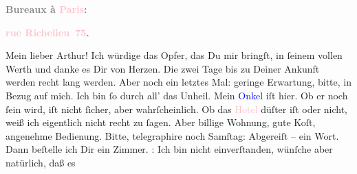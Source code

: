            \pstart
           \begin{otherlanguage}{french}\textcolor{gray}{\textbf{\textbf{Bureaux à \textcolor{pink}{Paris}{}\ledrightnote{\textcolor{pink}{Paris}}:}}}\end{otherlanguage}\pend
           \pstart
           \begin{otherlanguage}{french}\textcolor{gray}{\textbf{\textbf{\textcolor{pink}{rue Richelieu 75}{}\ledrightnote{\textcolor{pink}{rue Richelieu}}.}}}\end{otherlanguage}\pend
           \pstart\center{}Mein lieber Arthur!\pend\pstart
           Ich würdige das Opfer, das Du mir bringſt, in ſeinem vollen Werth und danke es Dir
               von Herzen. Die zwei Tage bis zu Deiner Ankunft werden recht lang werden. Aber noch
               ein letztes Mal: geringe Erwartung, bitte, in Bezug auf mich. Ich bin ſo \label{K_L02716-1v}\label{K_L02716-1h} durch all’
               das Unheil.\pend
           \pstart
           Mein \textcolor{blue}{Onkel}{} iſt hier. Ob er
               noch \label{K_L02716-2v}\label{K_L02716-2h} ſein wird, iſt nicht ſicher,
               aber wahrſcheinlich. Ob das {\pb}\textcolor{pink}{Hotel}{} düſter iſt oder nicht,
               weiß ich eigentlich nicht recht zu ſagen. Aber billige Wohnung, gute Koſt, angenehme
               Bedienung. Bitte, telegraphire noch Samſtag: Abgereiſt
                  – ein Wort. Dann beſtelle ich Dir ein Zimmer.\pend
           \pstart
           \label{K_L02716-3v}\label{K_L02716-3h}: Ich bin nicht einverſtanden, wünſche aber natürlich, daß es
